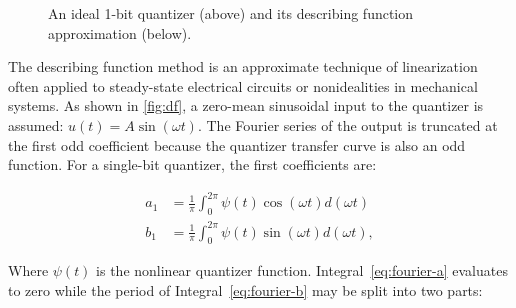 \begin{figure}
	\caption{An ideal 1-bit quantizer (above) and its describing function approximation (below).} \label{fig:df}
\end{figure}

The describing function method \cite{Taylor1999} is an approximate technique of linearization often applied to steady-state electrical circuits or nonidealities in mechanical systems. As shown in \autoref{fig:df}, a zero-mean sinusoidal input to the quantizer is assumed: $u(t) = A\sin(\omega t)$. The Fourier series of the output is truncated at the first odd coefficient because the quantizer transfer curve is also an odd function. For a single-bit quantizer, the first coefficients are:

\begin{align}
	a_1 &= \frac{1}{\pi} \int_0^{2\pi} \psi(t)\cos(\omega t) d(\omega t) \label{eq:fourier-a} \\
	b_1 &= \frac{1}{\pi} \int_0^{2\pi} \psi(t)\sin(\omega t) d(\omega t), \label{eq:fourier-b}
\end{align}

Where $\psi(t)$ is the nonlinear quantizer function. Integral~\ref{eq:fourier-a} evaluates to zero while the period of Integral~\ref{eq:fourier-b} may be split into two parts:

